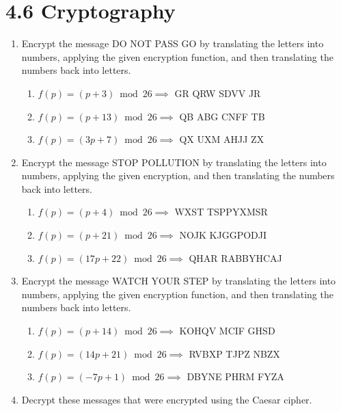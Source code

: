 \documentclass[11pt]{article}
\begin{document}
\section*{\textbf{4.6 Cryptography}}
\begin{enumerate}[label=\textbf{\arabic*.}]
	\item Encrypt the message DO NOT PASS GO by translating the letters into numbers, applying the given encryption function, and then translating the numbers back into letters.
	
	\begin{enumerate}[label=\textbf{\alph*)}]
		\item $f(p) = (p + 3) \bmod 26 \implies$ GR QRW SDVV JR
		\item $f(p) = (p + 13) \bmod 26 \implies$ QB ABG CNFF TB
		\item $f(p) = (3p + 7) \bmod 26 \implies$ QX UXM AHJJ ZX
	\end{enumerate}

	\item Encrypt the message STOP POLLUTION by translating the letters into numbers, applying the given encryption, and then translating the numbers back into letters.
	
	\begin{enumerate}[label=\textbf{\alph*)}]
		\item $f(p) = (p + 4) \bmod 26 \implies$ WXST TSPPYXMSR
		\item $f(p) = (p + 21) \bmod 26 \implies$ NOJK KJGGPODJI
		\item $f(p) = (17p + 22) \bmod 26 \implies$ QHAR RABBYHCAJ
	\end{enumerate}

	\item Encrypt the message WATCH YOUR STEP by translating the letters into numbers, applying the given encryption function, and then translating the numbers back into letters.
	
	\begin{enumerate}[label=\textbf{\alph*)}]
		\item $f(p) = (p + 14) \bmod 26 \implies$ KOHQV MCIF GHSD
		\item $f(p) = (14p + 21) \bmod 26 \implies$ RVBXP TJPZ NBZX
		\item $f(p) = (-7p + 1) \bmod 26 \implies$ DBYNE PHRM FYZA
	\end{enumerate}

	\item Decrypt these messages that were encrypted using the Caesar cipher.
	

\end{enumerate}
\end{document}
